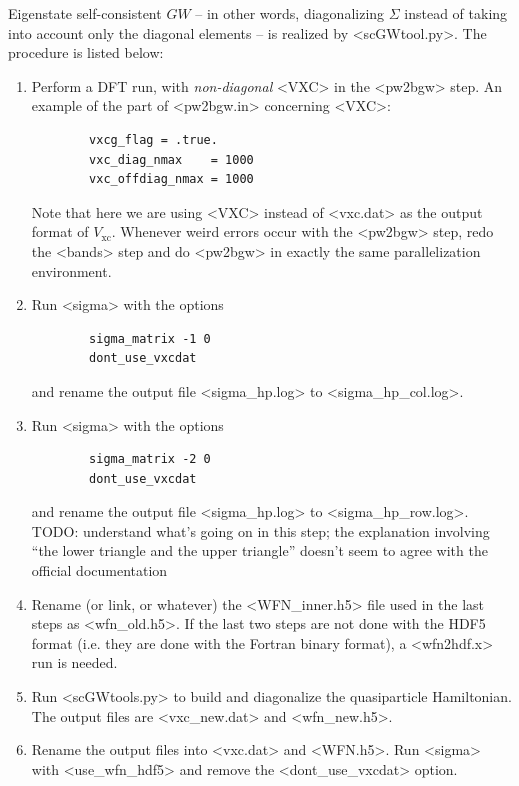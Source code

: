 \documentclass[hyperref, a4paper, 12pt]{report}
\def\texttt#1{<#1>}%
\newcommand{\shortcode}[1]{\texttt{#1}}
\begin{document}
Eigenstate self-consistent $GW$ 
-- in other words, diagonalizing $\Sigma$ instead of taking into account only the diagonal elements -- 
is realized by \shortcode{scGWtool.py}.
The procedure is listed below: 
\begin{enumerate}
    \item Perform a DFT run, with \emph{non-diagonal} \shortcode{VXC} in the \shortcode{pw2bgw} step. 
        An example of the part of \shortcode{pw2bgw.in} concerning \shortcode{VXC}:
        \begin{lstlisting}
        vxcg_flag = .true.
        vxc_diag_nmax    = 1000
        vxc_offdiag_nmax = 1000 
        \end{lstlisting}
        Note that here we are using \shortcode{VXC} instead of \shortcode{vxc.dat} 
        as the output format of $V_{\text{xc}}$.
        Whenever weird errors occur with the \shortcode{pw2bgw} step, 
        redo the \shortcode{bands} step 
        and do \shortcode{pw2bgw} in exactly the same parallelization environment.
    \item Run \shortcode{sigma} with the options 
        \begin{lstlisting}
        sigma_matrix -1 0
        dont_use_vxcdat
        \end{lstlisting}
        and rename the output file \shortcode{sigma_hp.log} to \shortcode{sigma_hp_col.log}.
    \item Run \shortcode{sigma} with the options 
        \begin{lstlisting}
        sigma_matrix -2 0
        dont_use_vxcdat
        \end{lstlisting}
        and rename the output file \shortcode{sigma_hp.log} to \shortcode{sigma_hp_row.log}.
        TODO: understand what's going on in this step; 
        the explanation involving ``the lower triangle and the upper triangle''
        doesn't seem to agree with the official documentation
    \item Rename (or link, or whatever) the \shortcode{WFN_inner.h5} file used in the last steps
        as \shortcode{wfn_old.h5}. 
        If the last two steps are not done with 
        the HDF5 format (i.e. they are done with the Fortran binary format),
        a \shortcode{wfn2hdf.x} run is needed. 
    \item Run \shortcode{scGWtools.py} to build and diagonalize the quasiparticle Hamiltonian.
        The output files are \shortcode{vxc_new.dat} and \shortcode{wfn_new.h5}. 
    \item Rename the output files into \shortcode{vxc.dat} and \shortcode{WFN.h5}. 
        Run \shortcode{sigma} with \shortcode{use_wfn_hdf5} 
        and remove the \shortcode{dont_use_vxcdat} option.
\end{enumerate}
\end{document}
